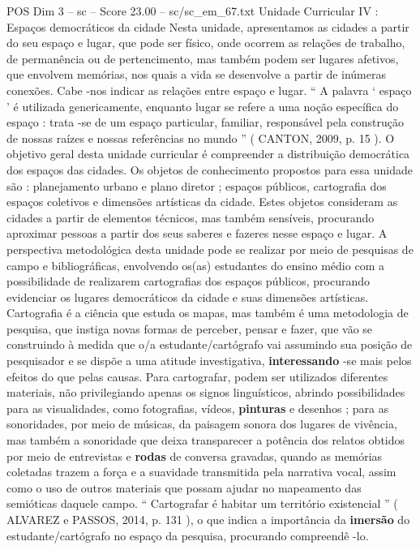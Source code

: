 \begin{textsample}{POS Dim 3 – sc – Score 23.00 – sc/sc\_em\_67.txt}
Unidade Curricular IV : Espaços democráticos da cidade Nesta unidade, apresentamos as cidades a partir do seu espaço e lugar, que pode ser físico, onde ocorrem as relações de trabalho, de permanência ou de pertencimento, mas também podem ser lugares afetivos, que envolvem memórias, nos quais a vida se desenvolve a partir de inúmeras conexões.
Cabe -nos indicar as relações entre espaço e lugar. “ A palavra ‘ espaço ’ é utilizada genericamente, enquanto lugar se refere a uma noção específica do espaço : trata -se de um espaço particular, familiar, responsável pela construção de nossas raízes e nossas referências no mundo ” ( CANTON, 2009, p. 15 ).
O objetivo geral desta unidade curricular é compreender a distribuição democrática dos espaços das cidades.
Os objetos de conhecimento propostos para essa unidade são : planejamento urbano e plano diretor ; espaços públicos, cartografia dos espaços coletivos e dimensões artísticas da cidade.
Estes objetos consideram as cidades a partir de elementos técnicos, mas também sensíveis, procurando aproximar pessoas a partir dos seus saberes e fazeres nesse espaço e lugar.
A perspectiva metodológica desta unidade pode se realizar por meio de pesquisas de campo e bibliográficas, envolvendo os(as) estudantes do ensino médio com a possibilidade de realizarem cartografias dos espaços públicos, procurando evidenciar os lugares democráticos da cidade e suas dimensões artísticas.
Cartografia é a ciência que estuda os mapas, mas também é uma metodologia de pesquisa, que instiga novas formas de perceber, pensar e fazer, que vão se construindo à medida que o/a estudante/cartógrafo vai assumindo sua posição de pesquisador e se dispõe a uma atitude investigativa, \textbf{interessando} -se mais pelos efeitos do que pelas causas.
Para cartografar, podem ser utilizados diferentes materiais, não privilegiando apenas os signos linguísticos, abrindo possibilidades para as visualidades, como fotografias, vídeos, \textbf{pinturas} e desenhos ; para as sonoridades, por meio de músicas, da paisagem sonora dos lugares de vivência, mas também a sonoridade que deixa transparecer a potência dos relatos obtidos por meio de entrevistas e \textbf{rodas} de conversa gravadas, quando as memórias coletadas trazem a força e a suavidade transmitida pela narrativa vocal, assim como o uso de outros materiais que possam ajudar no mapeamento das semióticas daquele campo. “ Cartografar é habitar um território existencial ” ( ALVAREZ e PASSOS, 2014, p. 131 ), o que indica a importância da \textbf{imersão} do estudante/cartógrafo no espaço da pesquisa, procurando compreendê -lo.

\end{textsample}
